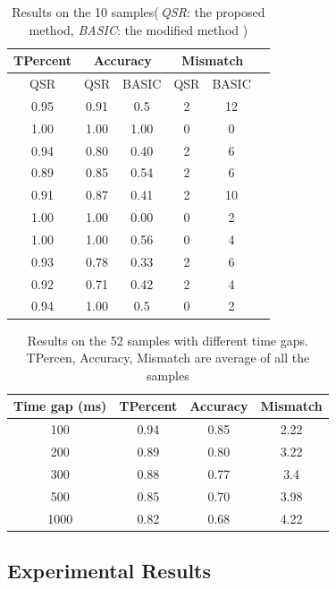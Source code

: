 \documentclass[letterpaper]{article}
\begin{document}
\begin{table}[t!]\small
\centering
\begin{tabular}{c|c|c|c|c|c}
\hline
{TPercent} & \multicolumn{2}{c}{Accuracy} & \multicolumn{2}{c}{Mismatch}\\
\hline
QSR  & QSR & BASIC & QSR & BASIC\\
\hline
0.95& 0.91 & 0.5 & 2 & 12\\
1.00&1.00 & 1.00 & 0 & 0\\
0.94&0.80 & 0.40 & 2 & 6\\
0.89&0.85 & 0.54 & 2 & 6\\
0.91&0.87 & 0.41 & 2 & 10\\
1.00&1.00 & 0.00 & 0 & 2\\
1.00&1.00 & 0.56 & 0 & 4\\
0.93&0.78 & 0.33 & 2 & 6 \\
0.92&0.71 & 0.42 & 2 & 4\\
0.94&1.00 & 0.5 & 0 & 2\\
\hline
\end{tabular}
\vspace{-2mm}
\caption{Results on the 10 samples(\,\emph{QSR}: the proposed method, \emph{BASIC}: the modified method )}\label{empiResults}
\vspace{-6mm}
\end{table}

\begin{table}[t!]\small

\centering
\begin{tabular}{c|c|c|c}
\hline
Time gap (ms) & TPercent & Accuracy & Mismatch\\
\hline
100 & 0.94 & 0.85 & 2.22\\
200 & 0.89 & 0.80 & 3.22\\
300 & 0.88 & 0.77 & 3.4\\
500 & 0.85 & 0.70 & 3.98\\
1000 & 0.82 & 0.68 & 4.22\\
\hline
\end{tabular}
\vspace{-2mm}
\caption{Results on the 52 samples with different time gaps. TPercen, Accuracy, Mismatch are average of all the samples }\label{empiResults_2}
\vspace{-7mm}
\end{table}


\subsection{Experimental Results}
\end{document}
